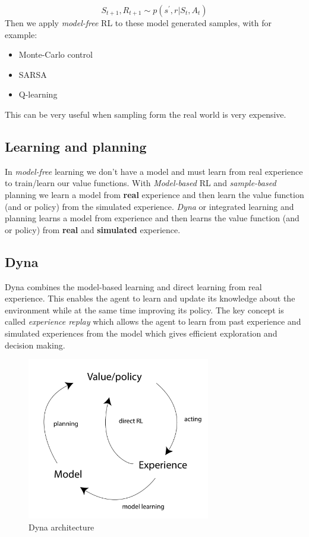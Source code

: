 	\begin{equation}
	 	S_{t+1}, R_{t+1} \sim p(s^{\prime},r|S_t,A_t)
	 \end{equation} 
Then we apply \emph{model-free} RL to these model generated samples, with for example:

	\begin{itemize}
	 	\item Monte-Carlo control
	 	\item SARSA
	 	\item Q-learning
	 \end{itemize} 

 This can be very useful when sampling form the real world is very expensive. 

\subsection{Learning and planning}
In \emph{model-free} learning we don't have a model and must learn from real experience to train/learn our value functions. With \emph{Model-based} RL and \emph{sample-based} planning we learn a model from \textbf{real} experience and then learn the value function (and or policy) from the simulated experience. \emph{Dyna} or integrated learning and planning learns a model from experience and then learns the value function (and or policy) from \textbf{real} and \textbf{simulated} experience. 


\subsection{Dyna}
Dyna combines the model-based learning and direct learning from real experience. This enables the agent to learn and update its knowledge about the environment while at the same time improving its policy. The key concept is called \emph{experience replay} which allows the agent to learn from past experience and simulated experiences from the model which gives efficient exploration and decision making.

\begin{figure}[ht!]
\centering
\includegraphics[width=80mm]{figures/dyna.pdf}
\caption{Dyna architecture}
\label{fig:dyna}
\end{figure}

